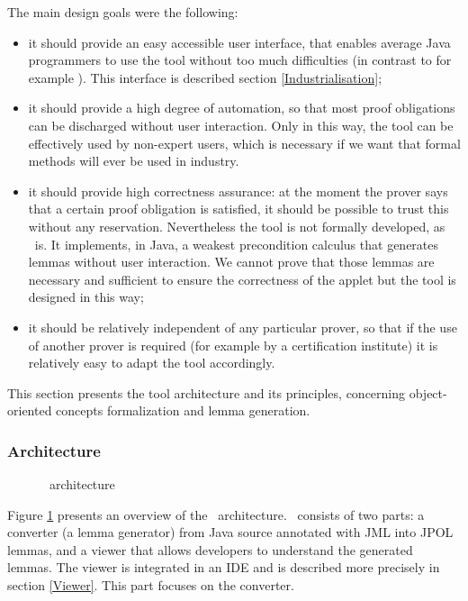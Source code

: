 \label{JavaAppletCorrectnessKit}
 The main design goals were the following:
 \begin{itemize}
 \item it should provide an easy accessible user interface, that enables average Java programmers to use the tool
 without too much difficulties (in contrast to for example \LOOP). This interface is
described section \ref{Industrialisation};
 \item it should provide a high degree of automation, so that most proof obligations can be discharged without user
 interaction. Only in this way, the tool can be effectively used by non-expert users, which is necessary if we want that
 formal methods will ever be used in industry. 
 \item it should provide high correctness assurance: at the moment the prover says that a certain proof obligation
is satisfied, it should be possible to trust this without any reservation. Nevertheless
the tool is not formally developed, as \LOOP\ is. It implements, in Java, a weakest precondition calculus that
generates lemmas without user interaction. We cannot prove that those lemmas are necessary and sufficient to
ensure the correctness of the applet but the tool is designed in this way;
 \item it should be relatively independent of any particular prover, so that if the use of another prover is
 required (for example by a certification institute) it is relatively easy to adapt the tool accordingly.
\end{itemize}

 This section presents the tool architecture and its principles,
 concerning object-oriented concepts formalization and lemma generation.
\subsubsection{Architecture}
\begin{figure}[tp]
 \caption{\JACK\ architecture}
 \label{JACKarchitecture}
\end{figure}
 Figure \ref{JACKarchitecture} presents an overview of the \JACK\
 architecture.  \JACK\ consists of two parts: a converter (a lemma generator) from
 Java source annotated with JML into JPOL lemmas, and a viewer that
 allows developers to understand the generated
 lemmas.  The viewer is integrated in an IDE and is described more precisely in section
 \ref{Viewer}.  This part focuses on the converter.

